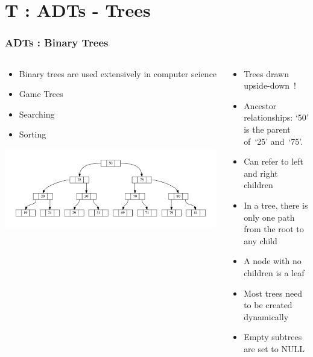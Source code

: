 \section{T : ADTs - Trees}
\label{chap:adts_trees}


\begin{frame}[fragile]
\frametitle{ADTs : Binary Trees}
\begin{columns}[T]

\begin{column}{0.45\textwidth}
\begin{itemize}[<+->]
\item Binary trees are used extensively in computer science	
\item Game Trees	
\item Searching	
\item Sorting	
\end{itemize}	
\pause
\begin{center}
\includegraphics[width=\textwidth]{../Images/Linkedb.pdf}	
\end{center}
\end{column}

\pause
\begin{column}{0.45\textwidth}
\begin{itemize}[<+->]
\item Trees drawn upside-down~!
\item Ancestor relationships: `50' is the parent of~`25' and~`75'.
\item Can refer to left and right children
\item In a tree, there is only one path from the root to any child
\item A node with no children is a leaf
\item Most trees need to be created dynamically
\item Empty subtrees are set to NULL
\end{itemize}
\end{column}

\end{columns}
\end{frame}

